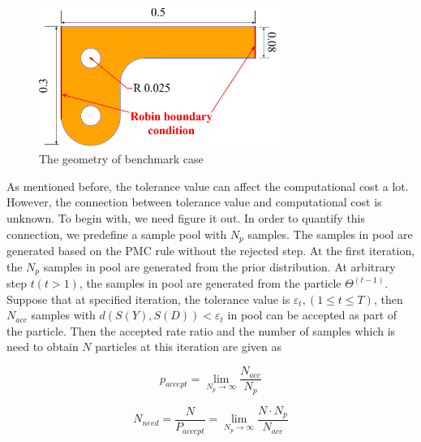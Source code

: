 \documentclass[review]{elsarticle}
\begin{document}
\begin{figure}
    \centering
    \includegraphics[width=0.7\textwidth]{fig/geo-benchmark.jpg}
    \caption{The geometry of benchmark case}
    \label{fig:benchmark_geo}
\end{figure}

As mentioned before, the tolerance value can affect the computational cost a lot. However, the connection between tolerance value and computational cost is unknown. To begin with, we need figure it out. In order to quantify this connection, we predefine a sample pool with $N_p$ samples. The samples in pool are generated based on the PMC rule without the rejected step. At the first iteration, the $N_p$ samples in pool are generated from the prior distribution. At arbitrary step $t (t>1)$, the samples in pool are generated from the particle $\Theta^{(t-1)}$. Suppose that at specified iteration, the tolerance value is $\varepsilon_t, (1\leq t \leq T)$, then $N_{acc}$ samples with $d(S(Y),S(D))<\varepsilon_t$ in pool can be accepted as part of the particle. Then the accepted rate ratio and the number of samples which is need to obtain $N$ particles at this iteration are given as

\begin{equation}
    p_{accept} = \lim_{N_p \to \infty} \frac{N_{acc}}{N_p}
\end{equation}

\begin{equation}
    N_{need} = \frac{N}{P_{accept}} = \lim_{N_p \to \infty} \frac{N\cdot N_p}{N_{acc}}
\end{equation}
\end{document}
